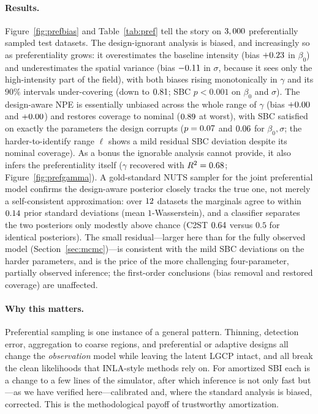 \documentclass[11pt]{article}
\begin{document}
\paragraph{Results.}
Figure~\ref{fig:prefbias} and Table~\ref{tab:pref} tell the story on
$3,000$ preferentially sampled test datasets. The design-ignorant analysis is
biased, and increasingly so as preferentiality grows: it overestimates the
baseline intensity (bias $+0.23$ in $\beta_0$) and underestimates
the spatial variance (bias $-0.11$ in $\sigma$, because it sees only
the high-intensity part of the field), with both biases rising monotonically in
$\gamma$ and its $90\%$ intervals under-covering (down to $0.81$;
SBC $p<0.001$ on $\beta_0$ and $\sigma$). The design-aware NPE is essentially
unbiased across the whole range of $\gamma$ (bias $+0.00$ and
$+0.00$) and restores coverage to nominal ($0.89$ at worst),
with SBC satisfied on exactly the parameters the design corrupts
($p=0.07$ and $0.06$ for $\beta_0,\sigma$; the harder-to-identify
range $\ell$ shows a mild residual SBC deviation despite its nominal coverage).
As a bonus the
ignorable analysis cannot provide, it also infers the preferentiality itself
($\gamma$ recovered with $R^2=0.68$; Figure~\ref{fig:prefgamma}). A
gold-standard NUTS sampler for the joint preferential model confirms the
design-aware posterior closely tracks the true one, not merely a self-consistent
approximation: over $12$ datasets the marginals agree to within
$0.14$ prior standard deviations (mean $1$-Wasserstein), and a classifier
separates the two posteriors only modestly above chance (C2ST $0.64$ versus
$0.5$ for identical posteriors). The small residual---larger here than for the
fully observed model (Section~\ref{sec:mcmc})---is consistent with the mild SBC
deviations on the harder parameters, and is the price of the more challenging
four-parameter, partially observed inference; the first-order conclusions
(bias removal and restored coverage) are unaffected.

\paragraph{Why this matters.}
Preferential sampling is one instance of a general pattern. Thinning,
detection error, aggregation to coarse regions, and preferential or adaptive
designs all change the \emph{observation} model while leaving the latent LGCP
intact, and all break the clean likelihoods that INLA-style methods rely on.
For amortized SBI each is a change to a few lines of the simulator, after which
inference is not only fast but---as we have verified here---calibrated and, where
the standard analysis is biased, corrected. This is the methodological payoff of
trustworthy amortization.
\end{document}
